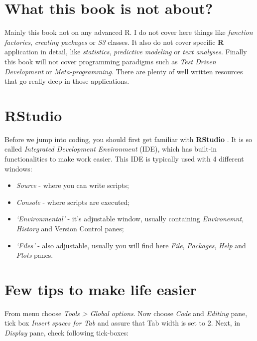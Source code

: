 \documentclass[]{book}
\providecommand{\tightlist}{%
  \setlength{\itemsep}{0pt}\setlength{\parskip}{0pt}}
\theoremstyle{definition}
\theoremstyle{definition}
\theoremstyle{definition}
\theoremstyle{remark}
\begin{document}
\section{What this book is not
about?}\label{what-this-book-is-not-about}

Mainly this book not on any advanced R. I do not cover here things like
\emph{function factories}, \emph{creating packages} or \emph{S3}
classes. It also do not cover specific \textbf{R} application in detail,
like \emph{statistics}, \emph{predictive modeling} or \emph{text
analyses}. Finally this book will not cover programming paradigms such
as \emph{Test Driven Development} or \emph{Meta-programming}. There are
plenty of well written resources that go really deep in those
applications.

\section{RStudio}\label{rstudio}

Before we jump into coding, you should first get familiar with
\textbf{RStudio} \citep{rstudio2017}. It is so called \emph{Integrated
Development Environment} (IDE), which has built-in functionalities to
make work easier. This IDE is typically used with 4 different windows:

\begin{itemize}
\tightlist
\item
  \emph{Source} - where you can write scripts;
\item
  \emph{Console} - where scripts are executed;
\item
  \emph{`Environmental'} - it's adjustable window, usually containing
  \emph{Environemnt}, \emph{History} and Version Control panes;
\item
  \emph{`Files'} - also adjustable, usually you will find here
  \emph{File}, \emph{Packages}, \emph{Help} and \emph{Plots} panes.
\end{itemize}

\section{Few tips to make life
easier}\label{few-tips-to-make-life-easier}

From menu choose \emph{Tools \textgreater{} Global options}. Now choose
\emph{Code} and \emph{Editing} pane, tick box \emph{Insert spaces for
Tab} and assure that Tab width is set to 2. Next, in \emph{Display}
pane, check following tick-boxes:
\end{document}

